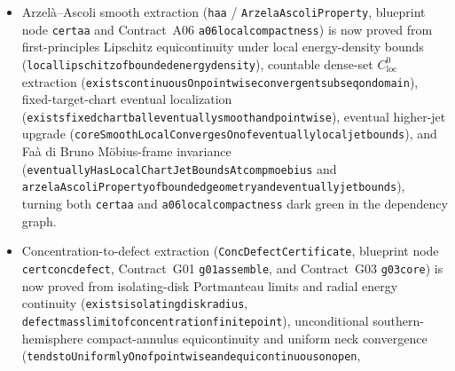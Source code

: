 \documentclass[11pt]{article}
\renewcommand{\_}{\origus\allowbreak}
\newcommand{\CP}{\mathbb{CP}^1}
\newcommand{\eps}{\varepsilon}
\newcommand{\code}[1]{\texttt{#1}}
\begin{document}
\begin{itemize}
  (\code{h\_conc\_extract} / \code{SmoothConcentrationExtractProperty}, blueprint node
  \code{cert\_conc} and Contract~C02 \code{c02\_concentration}) are now proved from first-principles
  southern-hemisphere compact-set $\eps$-regularity gradient bounds
  (\code{eventually\_gradient\_bound\_on\_compact\_southern\_hemisphere\_of\_disjoint\_S}), pointwise
  energy density convergence under $C^\infty_{\mathrm{loc}}$ convergence
  (\code{tendsto\_riemannianEnergyDensity\_of\_smoothLocalConvergesOn}), Lebesgue dominated
  convergence against the integrable spherical Jacobian with monotone Urysohn exhaustion of open
  subsets of $\CP\setminus S$ (\code{defect\_measure\_decomp\_of\_smooth\_conv\_off\_S}), and
  \code{Finset}-inductive iterated singularity removal across $S$
  (\code{jholomorphic\_extension\_across\_finset} and
  \code{smoothConcentrationExtractProperty\_of\_local\_compactness\_and\_removal}), turning both
  \code{cert\_conc} and \code{c02\_concentration} dark green in the dependency graph.
\item Arzel\`a--Ascoli smooth extraction (\code{h\_aa} / \code{ArzelaAscoliProperty}, blueprint node
  \code{cert\_aa} and Contract~A06 \code{a06\_local\_compactness}) is now proved from first-principles
  Lipschitz equicontinuity under local energy-density bounds
  (\code{local\_lipschitz\_of\_bounded\_energy\_density}), countable dense-set $C^0_{\mathrm{loc}}$
  extraction (\code{exists\_continuousOn\_pointwise\_convergent\_subseq\_on\_domain}), fixed-target-chart
  eventual localization (\code{exists\_fixed\_chart\_ball\_eventually\_smooth\_and\_pointwise}),
  eventual higher-jet upgrade (\code{coreSmoothLocalConvergesOn\_of\_eventually\_local\_jet\_bounds}),
  and Fa\`a di Bruno M\"obius-frame invariance
  (\code{eventuallyHasLocalChartJetBoundsAt\_comp\_moebius} and
  \code{arzelaAscoliProperty\_of\_bounded\_geometry\_and\_eventually\_jet\_bounds}), turning both
  \code{cert\_aa} and \code{a06\_local\_compactness} dark green in the dependency graph.
\item Concentration-to-defect extraction (\code{ConcDefectCertificate}, blueprint node
  \code{cert\_concdefect}, Contract~G01 \code{g01\_assemble}, and Contract~G03 \code{g03\_core}) is
  now proved from isolating-disk Portmanteau limits and radial energy continuity
  (\code{exists\_isolating\_disk\_radius},
  \code{defect\_mass\_limit\_of\_concentration\_finite\_point}), unconditional southern-hemisphere
  compact-annulus equicontinuity and uniform neck convergence
  (\code{tendstoUniformlyOn\_of\_pointwise\_and\_equicontinuous\_on\_open},

\end{itemize}
\end{document}
